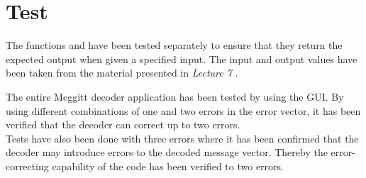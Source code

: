 \documentclass[Main]{subfiles}
\begin{document}
\chapter{Test}
The functions  and  have been tested separately to ensure that they return the expected output when given a specified input. The input and output values have been taken from the material presented in \emph{Lecture 7} \cite{lec7}.

The entire Meggitt decoder application has been tested by using the GUI. By using different combinations of one and two errors in the error vector, it has been verified that the decoder can correct up to two errors.
\\Tests have also been done with three errors where it has been confirmed that the decoder may introduce errors to the decoded message vector. Thereby the error-correcting capability of the code has been verified to two errors.  
\end{document}
